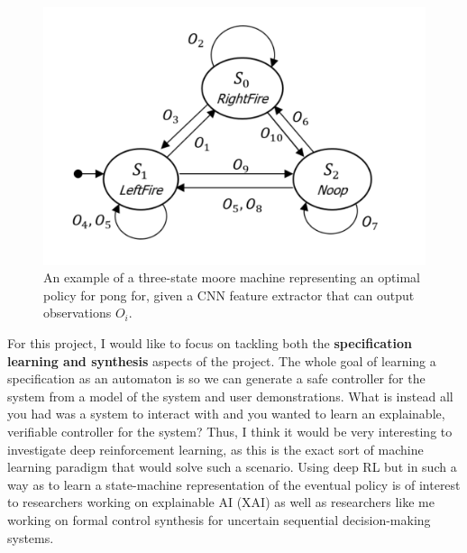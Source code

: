 \begin{figure}
    \centering
    \includegraphics[width=0.4\linewidth]{Figures/pong_moore_machine.png}
    \caption{An example of a three-state moore machine representing an optimal policy for pong for, given a CNN feature extractor that can output observations $O_i$.}
    \label{fig: pong_moore_machine}
\end{figure}

For this project, I would like to focus on tackling both the \textbf{specification learning and synthesis} aspects of the project. The whole goal of learning a specification as an automaton is so we can generate a safe controller for the system from a model of the system and user demonstrations. What is instead all you had was a system to interact with and you wanted to learn an explainable, verifiable controller for the system? Thus, I think it would be very interesting to investigate deep reinforcement learning, as this is the exact sort of machine learning paradigm that would solve such a scenario. Using deep RL but in such a way as to learn a state-machine representation of the eventual policy is of interest to researchers working on explainable AI (XAI) as well as researchers like me working on formal control synthesis for uncertain sequential decision-making systems.
